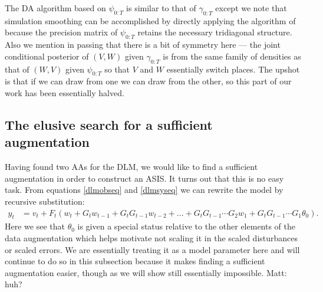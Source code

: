 \documentclass{article}
\newcommand{\matt}[1]{{\color{red} Matt: #1}}
\begin{document}
The DA algorithm based on $\psi_{0:T}$ is similar to that of $\gamma_{0:T}$ except we note that simulation smoothing can be accomplished by directly applying the algorithm of \citet{mccausland2011simulation} because the precision matrix of $\psi_{0:T}$ retains the necessary tridiagonal structure. Also we mention in passing that there is a bit of symmetry here --- the joint conditional posterior of $(V,W)$ given $\gamma_{0:T}$ is from the same family of densities as that of $(W,V)$ given $\psi_{0:T}$ so that $V$ and $W$ essentially switch places. The upshot is that if we can draw from one we can draw from the other, so this part of our work has been essentially halved.





\subsection{The elusive search for a sufficient augmentation}

Having found two AAs for the DLM, we would like to find a sufficient augmentation in order to construct an ASIS. It turns out that this is no easy task. From equations \eqref{dlmobseq} and \eqref{dlmsyseq} we can rewrite the model by recursive substitution:
\begin{align*}
  y_t &= v_t + F_t\left(w_t + G_tw_{t-1} + G_tG_{t-1}w_{t-2} + ... + G_tG_{t-1}\cdots G_{2}w_1 + G_tG_{t-1}\cdots G_1\theta_0\right).
\end{align*}
Here we see that $\theta_0$ is given a special status relative to the other elements of the data augmentation which helps motivate not scaling it in the scaled disturbances or scaled errors. We are essentially treating it as a model parameter here and will continue to do so in this subsection because it makes finding a sufficient augmentation easier, though as we will show still essentially impossible. \matt{huh?}
\end{document}
